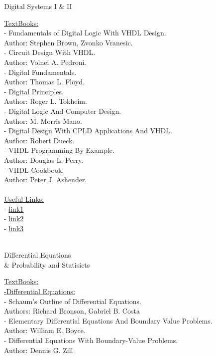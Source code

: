 \documentclass{article}
\begin{document}
\newpage
\begin{center}
    \huge Digital Systems I \& II
\end{center}
\underline{\Large TextBooks:}\\ [0.15cm]
- Fundamentals of Digital Logic With VHDL Design.\\
\indent Author: Stephen Brown, Zvonko Vranesic.\\
- Circuit Design With VHDL. \\
\indent Author: Volnei A. Pedroni. \\
- Digital Fundamentals. \\
\indent Author: Thomas L. Floyd. \\
- Digital Principles.\\
\indent Author: Roger L. Tokheim.\\
- Digital Logic And Computer Design.\\
\indent Author: M. Morris Mano.\\
- Digital Design With CPLD Applications And VHDL.\\
\indent Author: Robert Dueck. \\
- VHDL Programming By Example.\\
\indent Author: Douglas L. Perry. \\ 
- VHDL Cookbook.\\
\indent Author: Peter J. Ashender. \\ \\

\noindent\underline{\Large Useful Links:}\\
- \href{URL}{link1}\\
- \href{URL}{link2}\\
- \href{URL}{link3}\\\\


\newpage
\begin{center}
    \huge Differential Equations \\ \& Probability and Statisicts
\end{center}
\underline{\Large TextBooks:}\\
\indent \underline{\large -Differential Equations:} \\[0.15cm]
\indent - Schaum's Outline of Differential Equations. \\ 
\indent \indent Authors: Richard Bronson, Gabriel B. Costa\\
\indent - Elementary Differential Equations And Boundary Value Problems. \\ 
\indent \indent Author: William
 E. Boyce.\\
\indent - Differential Equations With Boundary-Value Problems. \\ 
\indent \indent Author: Dennis G. Zill\\
\end{document}
